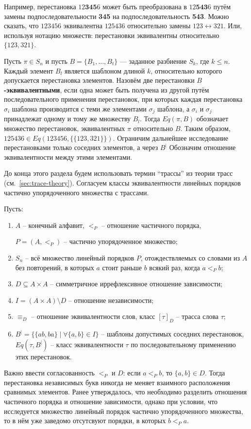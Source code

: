 Например, перестановка $12\textbf{345}6$ может быть преобразована в
$12\textbf{543}6$ путём замены подпоследовательности \textbf{345} на
подпоследовательность \textbf{543}. Можно сказать, что $123456$
эквивалентна $125436$ относительно замены $123 \leftrightarrow 321$.
Или, используя нотацию множеств: перестановки эквивалентны
относительно $\{123, 321\}$.

Пусть $\pi \in S_n$ и пусть $B = \{B_1, \dots, B_t\}$ — заданное
разбиение $S_k$, где $k \le n$. Каждый элемент $B_l$ является
шаблоном длиной $k$, относительно которого допускается перестановка
элементов. Назовём две перестановки \textbf{$B$-эквивалентными}, если
одна может быть получена из другой путём последовательного применения
перестановок, при которых каждая перестановка $\sigma_i$ шаблона
производится с теми же элементами $\sigma_j$ шаблона, а $\sigma_i$ и
$\sigma_j$ принадлежат одному и тому же множеству $B_l$. Тогда
$Eq(\pi, B)$ обозначает множество перестановок, эквивалентных $\pi$
относительно $B$.
Таким образом, $125436 \in Eq(123456, \{\{123, 321\}\})$.
Ограничим дальнейшее исследование перестановками только соседних
элементов, а через $B^{|}$ Обозначим отношение эквивалентности между
этими элементами.

До конца этого раздела будем использовать термин ``трассы'' из теории
трасс (см.~\ref{sec:trace-theory}).
Согласуем классы эквивалентности линейных порядков частично
упорядоченного множества с трассами.

Пусть:
\begin{enumerate}
  \item $A$ -- конечный алфавит, $<_P$ -- отношение частичного
    порядка,

    \noindent
    $P = (A, <_P)$ -- частично упорядоченное множество;
  \item $S_n$ -- всё множество линейный порядков $P$,
    отождествляемых со словами из $A$ без повторений, в которых $a$
    стоит раньше $b$ всякий раз, когда $a <_P b$;
  \item $D \subseteq A \times A$ -- симметричное иррефлексивное
    отношение зависимости;
  \item $I = (A \times A) \setminus D$ -- отношение независимости;
  \item $\equiv_D$ -- отношение эквивалентности слов, класс
    $[\tau]_D$ -- трасса слова $\tau$;
  \item $B^{|} = \{\{ab, ba\} \mid \forall \{a, b\} \in I \}$ --
    шаблоны допустимых соседних перестановок, $Eq(\tau, B^|)$ --
    класс эквивалентности $\tau$ по последовательному применению
    этих перестановок.
\end{enumerate}
Важно ввести согласованность $<_P$ и $D$: если $a <_P b$,
то $\{a, b\} \in D$.
Тогда перестановка независимых букв никогда не меняет взаимного
расположения сравнимых элементов.
Ранее утверждалось, что необходимо разделить отношения частичного
порядка и отношение зависимости, однако при условии, что
исследуется множество линейный порядок частично упорядоченного
множества, то в нём уже заведомо отсутсвуют порядки, в которых $b <_P a$.

